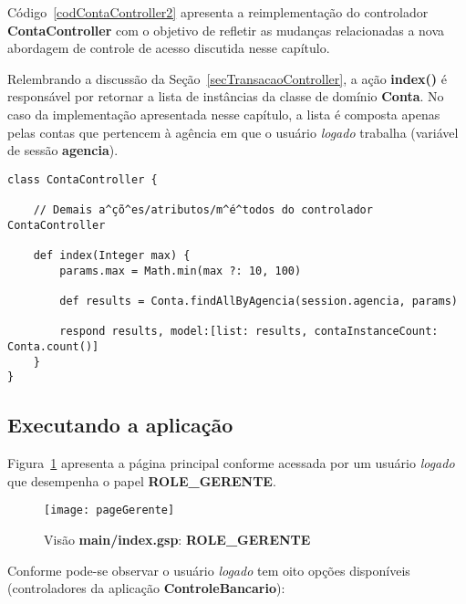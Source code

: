 \vspace{0.5cm}

Código~\ref{codContaController2} apresenta a reimplementação do controlador {\bf
  ContaController} com  o objetivo de  refletir as mudanças relacionadas  a nova
abordagem de controle de acesso discutida nesse capítulo.  

Relembrando  a  discussão  da  Seção~\ref{secTransacaoController}, a  ação  {\bf
  index()} é responsável por retornar a lista de instâncias da classe de domínio
{\bf Conta}.   No caso  da implementação apresentada  nesse capítulo, a  lista é
composta  apenas pelas  contas que  pertencem à  agência em  que o  usuário {\it
  logado} trabalha (variável de sessão {\bf agencia}).

\begin{lstlisting}[caption=Controlador    {\bf   ContaController},   frame=trBL,
    float=htbp, label=codContaController2] 
class ContaController {

    // Demais a^çõ^es/atributos/m^é^todos do controlador ContaController
    
    def index(Integer max) {
        params.max = Math.min(max ?: 10, 100)
        
        def results = Conta.findAllByAgencia(session.agencia, params)
                
        respond results, model:[list: results, contaInstanceCount: Conta.count()]
    }
}
\end{lstlisting}

\subsection{Executando a aplicação}

\vspace{0.5cm}

Figura~\ref{figPageGerente} apresenta  a página principal  conforme acessada por
um usuário {\it logado} que desempenha o papel {\bf ROLE\_GERENTE}. 

\begin{figure}[htbp]
\centering\texttt{[image: pageGerente]}
\caption{Visão {\bf main/index.gsp}: {\bf ROLE\_GERENTE}}
\label{figPageGerente}
\end{figure}

Conforme pode-se  observar o  usuário {\it logado}  tem oito  opções disponíveis
(controladores da aplicação {\bf ControleBancario}): 

\vspace{0.3cm}

